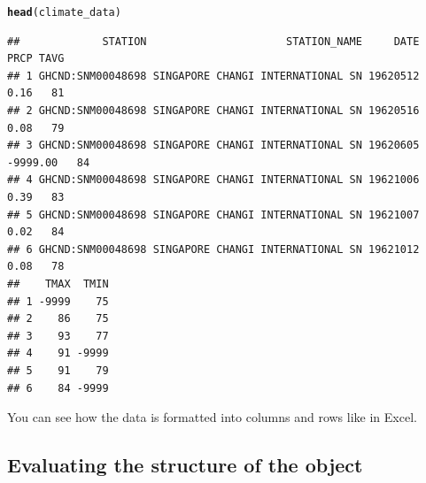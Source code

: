 \documentclass{article}\usepackage[]{graphicx}\usepackage[]{color}
\makeatletter
\newcommand{\hlstd}[1]{\textcolor[rgb]{0.345,0.345,0.345}{#1}}%
\newcommand{\hlkwd}[1]{\textcolor[rgb]{0.737,0.353,0.396}{\textbf{#1}}}%
\newenvironment{kframe}{%
 \def\at@end@of@kframe{}%
 \ifinner\ifhmode%
  \def\at@end@of@kframe{\end{minipage}}%
  \begin{minipage}{\columnwidth}%
 \fi\fi%
 \def\FrameCommand##1{\hskip\@totalleftmargin \hskip-\fboxsep
 \colorbox{shadecolor}{##1}\hskip-\fboxsep
     \hskip-\linewidth \hskip-\@totalleftmargin \hskip\columnwidth}%
 \MakeFramed {\advance\hsize-\width
   \@totalleftmargin\z@ \linewidth\hsize
   \@setminipage}}%
 {\par\unskip\endMakeFramed%
 \at@end@of@kframe}
\newenvironment{knitrout}{}{} %
\makeatother
\begin{document}
\begin{knitrout}
\color{fgcolor}\begin{kframe}
\begin{alltt}
\hlkwd{head}\hlstd{(climate_data)}
\end{alltt}
\begin{verbatim}
##             STATION                      STATION_NAME     DATE     PRCP TAVG
## 1 GHCND:SNM00048698 SINGAPORE CHANGI INTERNATIONAL SN 19620512     0.16   81
## 2 GHCND:SNM00048698 SINGAPORE CHANGI INTERNATIONAL SN 19620516     0.08   79
## 3 GHCND:SNM00048698 SINGAPORE CHANGI INTERNATIONAL SN 19620605 -9999.00   84
## 4 GHCND:SNM00048698 SINGAPORE CHANGI INTERNATIONAL SN 19621006     0.39   83
## 5 GHCND:SNM00048698 SINGAPORE CHANGI INTERNATIONAL SN 19621007     0.02   84
## 6 GHCND:SNM00048698 SINGAPORE CHANGI INTERNATIONAL SN 19621012     0.08   78
##    TMAX  TMIN
## 1 -9999    75
## 2    86    75
## 3    93    77
## 4    91 -9999
## 5    91    79
## 6    84 -9999
\end{verbatim}
\end{kframe}
\end{knitrout}
You can see how the data is formatted into columns and rows like in Excel. 

\subsection{Evaluating the structure of the object}
\end{document}
